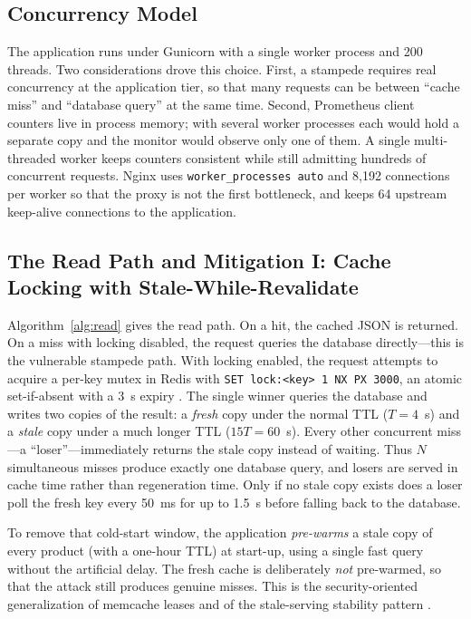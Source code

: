 \subsection{Concurrency Model}
The application runs under Gunicorn with a single worker process and 200 threads.
Two considerations drove this choice. First, a stampede requires real concurrency at
the application tier, so that many requests can be between ``cache miss'' and
``database query'' at the same time. Second, Prometheus client counters live in
process memory; with several worker processes each would hold a separate copy and the
monitor would observe only one of them. A single multi-threaded worker keeps counters
consistent while still admitting hundreds of concurrent requests. Nginx uses
\texttt{worker\_processes auto} and 8{,}192 connections per worker so that the proxy is
not the first bottleneck, and keeps 64 upstream keep-alive connections to the
application.

\subsection{The Read Path and Mitigation I: Cache Locking with Stale-While-Revalidate}
\label{sec:design-lock}
Algorithm~\ref{alg:read} gives the read path. On a hit, the cached JSON is returned.
On a miss with locking disabled, the request queries the database directly---this is
the vulnerable stampede path. With locking enabled, the request attempts to acquire a
per-key mutex in Redis with \texttt{SET lock:<key> 1 NX PX 3000}, an atomic
set-if-absent with a 3~s expiry \cite{redisdocs}. The single winner queries the
database and writes two copies of the result: a \emph{fresh} copy under the normal TTL
($T=4$~s) and a \emph{stale} copy under a much longer TTL ($15T=60$~s). Every other
concurrent miss---a ``loser''---immediately returns the stale copy instead of waiting.
Thus $N$ simultaneous misses produce exactly one database query, and losers are served
in cache time rather than regeneration time. Only if no stale copy exists does a loser
poll the fresh key every 50~ms for up to 1.5~s before falling back to the database.

To remove that cold-start window, the application \emph{pre-warms} a stale copy of
every product (with a one-hour TTL) at start-up, using a single fast query without the
artificial delay. The fresh cache is deliberately \emph{not} pre-warmed, so that the
attack still produces genuine misses. This is the security-oriented generalization of
memcache leases \cite{nishtala2013} and of the stale-serving stability pattern
\cite{nygard2018,rfc5861}.

